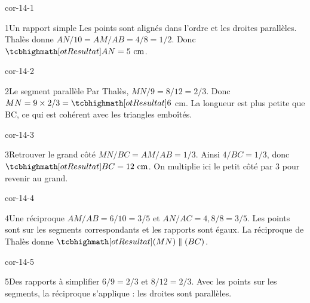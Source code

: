 \clearpage\pagestyle{otMain}\setlength{\otBlocEspacement}{2.5mm}\fontsize{11}{15}\selectfont{}
\begin{blocLivre}{cor-14-1}\begin{corrige}{1}{Un rapport simple}
Les points sont alignés dans l’ordre et les droites parallèles. Thalès donne $AN/10=AM/AB=4/8=1/2$. Donc $\res{AN=5\ \mathrm{cm}}$.
\label{fig-cor-14-1}
\end{corrige}\end{blocLivre}
\begin{blocLivre}{cor-14-2}\begin{corrige}{2}{Le segment parallèle}
Par Thalès, $MN/9=8/12=2/3$. Donc $MN=9\times2/3=\res6$ cm. La longueur est plus petite que BC, ce qui est cohérent avec les triangles emboîtés.
\label{fig-cor-14-2}
\end{corrige}\end{blocLivre}
\begin{blocLivre}{cor-14-3}\begin{corrige}{3}{Retrouver le grand côté}
$MN/BC=AM/AB=1/3$. Ainsi $4/BC=1/3$, donc $\res{BC=12\ \mathrm{cm}}$. On multiplie ici le petit côté par 3 pour revenir au grand.
\label{fig-cor-14-3}
\end{corrige}\end{blocLivre}
\begin{blocLivre}{cor-14-4}\begin{corrige}{4}{Une réciproque}
$AM/AB=6/10=3/5$ et $AN/AC=4{,}8/8=3/5$. Les points sont sur les segments correspondants et les rapports sont égaux. La réciproque de Thalès donne $\res{(MN)\parallel(BC)}$.
\label{fig-cor-14-4}
\end{corrige}\end{blocLivre}
\begin{blocLivre}{cor-14-5}\begin{corrige}{5}{Des rapports à simplifier}
$6/9=2/3$ et $8/12=2/3$. Avec les points sur les segments, la réciproque s’applique : les droites sont parallèles.
\label{fig-cor-14-5}
\end{corrige}\end{blocLivre}
